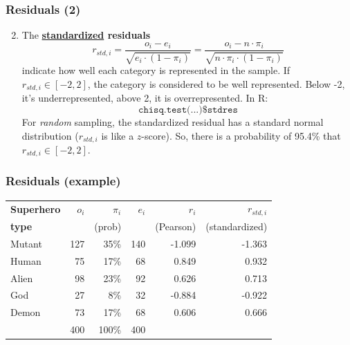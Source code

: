 \documentclass{beamer}
\begin{document}
\begin{frame}
\frametitle{Residuals (2)}

\begin{enumerate}
\setcounter{enumi}{1}
\item The \textbf{\underline{standardized} residuals}
\[ r_{std,i} = \frac{o_i-e_i}{\sqrt{e_i \cdot (1-\pi_i)}} = \frac{o_i - n \cdot \pi_i}{\sqrt{n \cdot \pi_i \cdot (1-\pi_i)}}\]
indicate how well each category is represented in the sample.
\vfill
If $r_{std,i} \in [-2,2]$, the category is considered to be well represented.
Below -2, it's underrepresented, above 2, it is overrepresented.
\vfill
    In R:
    \[ \texttt{chisq.test(...)\$stdres} \]
\vfill
\scriptsize For \textit{random} sampling, the standardized residual has a standard normal distribution ($r_{std,i}$ is like a $z$-score).
So, there is a probability of 95.4\% that $r_{std,i} \in [-2,2]$.

\end{enumerate}
\end{frame}

\begin{frame}
\frametitle{Residuals (example)}

\begin{table}[h]
    \begin{tabular}{@{}lrrrrr@{}}
        \toprule
\textbf{Superhero} & $o_i$ & $\pi_i$ & $e_i$ & $r_i$ & $r_{std,i}$ \\
\textbf{type}      & & \scriptsize{(prob)} & & \scriptsize{(Pearson)} & \scriptsize{(standardized)} \\ \midrule
        Mutant & 127   & 35\%           & 140          & -1.099 & -1.363 \\
        Human  & 75    & 17\%           & 68           & 0.849  & 0.932 \\
        Alien  & 98    & 23\%           & 92           & 0.626  & 0.713 \\
        God    & 27    & 8\%            & 32           & -0.884 & -0.922 \\
        Demon  & 73    & 17\%           & 68           & 0.606  & 0.666 \\ \bottomrule
        & 400 & 100\% & 400 & & \\
    \end{tabular}
\end{table}

\end{frame}
\end{document}
